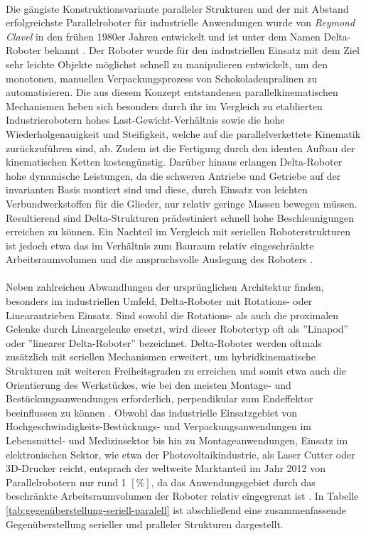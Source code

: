\documentclass[Bachelor, BMR, ngerman]{twbook}
\begin{document}
    \\
    Die gängiste Konstruktionsvariante paralleler Strukturen und der mit Abstand erfolgreichste Parallelroboter für industrielle Anwendungen wurde von \textit{Reymond Clavel} in den frühen 1980er Jahren entwickelt und ist unter dem Namen Delta-Roboter bekannt \cite{Cl90,CrLe17,SoVa18}. Der Roboter wurde für den industriellen Einsatz mit dem Ziel sehr leichte Objekte möglichst schnell zu manipulieren entwickelt, um den monotonen, manuellen Verpackungsprozess von Schokoladenpralinen zu automatisieren. \cite{BrCo15} Die aus diesem Konzept entstandenen parallelkinematischen Mechanismen heben sich besonders durch ihr im Vergleich zu etablierten Industrierobotern hohes Last-Gewicht-Verhältnis sowie die hohe Wiederholgenauigkeit und Steifigkeit, welche auf die parallelverkettete Kinematik zurückzuführen sind, ab. Zudem ist die Fertigung durch den identen Aufbau der kinematischen Ketten kostengünstig. Darüber hinaus erlangen Delta-Roboter hohe dynamische Leistungen, da die schweren Antriebe und Getriebe auf der invarianten Basis montiert sind und diese, durch Einsatz von leichten Verbundwerkstoffen für die Glieder, nur relativ geringe Massen bewegen müssen. Resultierend sind Delta-Strukturen prädestiniert schnell hohe Beschleunigungen erreichen zu können. Ein Nachteil im Vergleich mit seriellen Roboterstrukturen ist jedoch etwa das im Verhältnis zum Bauraum relativ eingeschränkte Arbeitsraumvolumen und die anspruchsvolle Auslegung des Roboters \cite{Ne06}.\\
    \\
    Neben zahlreichen Abwandlungen der ursprünglichen Architektur finden, besonders im industriellen Umfeld, Delta-Roboter mit Rotations- oder Linearantrieben Einsatz. Sind sowohl die Rotations- als auch die proximalen Gelenke durch Lineargelenke ersetzt, wird dieser Robotertyp oft als ''Linapod'' oder ''linearer Delta-Roboter'' bezeichnet.  Delta-Roboter werden oftmals zusätzlich mit seriellen Mechanismen erweitert, um hybridkinematische Strukturen mit weiteren Freiheitsgraden zu erreichen und somit etwa auch die Orientierung des Werkstückes, wie bei den meisten Montage- und Bestückungsanwendungen erforderlich, perpendikular zum Endeffektor beeinflussen zu können \cite{BrCo15}. Obwohl das industrielle Einsatzgebiet von Hochgeschwindigkeits-Bestückungs- und Verpackungsanwendungen im Lebensmittel- und Medizinsektor bis hin zu Montageanwendungen, Einsatz im elektronischen Sektor, wie etwa der Photovoltaikindustrie, als Laser Cutter oder 3D-Drucker reicht, entsprach der weltweite Marktanteil im Jahr 2012 von Parallelrobotern nur rund 1 $[\%]$, da das Anwendungsgebiet durch das beschränkte Arbeitsraumvolumen der Roboter relativ eingegrenzt ist \cite{BrCo15}. In Tabelle \ref{tab:gegenüberstellung-seriell-paralell} ist abschließend eine zusammenfassende Gegenüberstellung serieller und pralleler Strukturen dargestellt.
\end{document}
